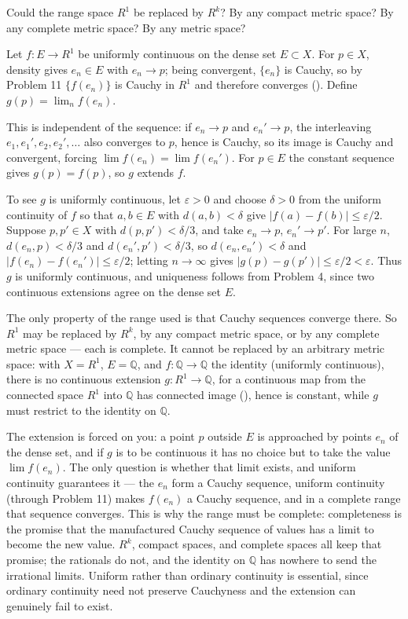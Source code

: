 \documentclass[main.tex]{subfiles}
\begin{document}
Could the range space $R^{1}$ be replaced by $R^{k}$? By any compact metric space? By any complete metric space? By any metric space?
\begin{SolutionBlue}
Let $f : E \to R^{1}$ be uniformly continuous on the dense set $E \subset X$. For $p \in X$, density gives $e_{n} \in E$ with $e_{n} \to p$; being convergent, $\{e_{n}\}$ is Cauchy, so by Problem 11 $\{f(e_{n})\}$ is Cauchy in $R^{1}$ and therefore converges (). Define $g(p) = \lim_{n} f(e_{n})$.

This is independent of the sequence: if $e_{n} \to p$ and $e_{n}' \to p$, the interleaving $e_{1}, e_{1}', e_{2}, e_{2}', \dots$ also converges to $p$, hence is Cauchy, so its image is Cauchy and convergent, forcing $\lim f(e_{n}) = \lim f(e_{n}')$. For $p \in E$ the constant sequence gives $g(p) = f(p)$, so $g$ extends $f$.

To see $g$ is uniformly continuous, let $\varepsilon > 0$ and choose $\delta > 0$ from the uniform continuity of $f$ so that $a, b \in E$ with $d(a, b) < \delta$ give $|f(a) - f(b)| \le \varepsilon/2$. Suppose $p, p' \in X$ with $d(p, p') < \delta/3$, and take $e_{n} \to p$, $e_{n}' \to p'$. For large $n$, $d(e_{n}, p) < \delta/3$ and $d(e_{n}', p') < \delta/3$, so $d(e_{n}, e_{n}') < \delta$ and $|f(e_{n}) - f(e_{n}')| \le \varepsilon/2$; letting $n \to \infty$ gives $|g(p) - g(p')| \le \varepsilon/2 < \varepsilon$. Thus $g$ is uniformly continuous, and uniqueness follows from Problem 4, since two continuous extensions agree on the dense set $E$.

The only property of the range used is that Cauchy sequences converge there. So $R^{1}$ may be replaced by $R^{k}$, by any compact metric space, or by any complete metric space --- each is complete. It cannot be replaced by an arbitrary metric space: with $X = R^{1}$, $E = \mathbb{Q}$, and $f : \mathbb{Q} \to \mathbb{Q}$ the identity (uniformly continuous), there is no continuous extension $g : R^{1} \to \mathbb{Q}$, for a continuous map from the connected space $R^{1}$ into $\mathbb{Q}$ has connected image (), hence is constant, while $g$ must restrict to the identity on $\mathbb{Q}$.
\end{SolutionBlue}
\begin{Reflection}
The extension is forced on you: a point $p$ outside $E$ is approached by points $e_{n}$ of the dense set, and if $g$ is to be continuous it has no choice but to take the value $\lim f(e_{n})$. The only question is whether that limit exists, and uniform continuity guarantees it --- the $e_{n}$ form a Cauchy sequence, uniform continuity (through Problem 11) makes $f(e_{n})$ a Cauchy sequence, and in a complete range that sequence converges. This is why the range must be complete: completeness is the promise that the manufactured Cauchy sequence of values has a limit to become the new value. $R^{k}$, compact spaces, and complete spaces all keep that promise; the rationals do not, and the identity on $\mathbb{Q}$ has nowhere to send the irrational limits. Uniform rather than ordinary continuity is essential, since ordinary continuity need not preserve Cauchyness and the extension can genuinely fail to exist.
\end{Reflection}
\end{document}
